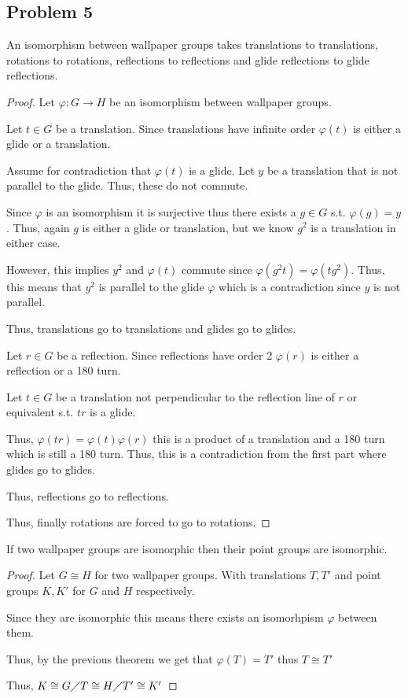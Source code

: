 \documentclass[12pt, letterpaper]{article}
\theoremstyle{definition}
\begin{document}
\subsection*{Problem 5}
\begin{theorem}
    An isomorphism between wallpaper groups takes translations to translations, rotations to rotations, reflections to reflections and glide reflections to glide reflections.
\end{theorem}
    \begin{proof}
        Let $\varphi: G \rightarrow H$ be an isomorphism between wallpaper groups.

        Let $t \in G$ be a translation. Since translations have infinite order $\varphi(t)$ is either a glide or a translation.

        Assume for contradiction that $\varphi(t)$ is a glide. Let $y$ be a translation that is not parallel to the glide. Thus, these do not commute.

        Since $\varphi$ is an isomorphism it is surjective thus there exists a $g \in G$ s.t. $\varphi(g)=y$. Thus, again $g$ is either a glide or translation, but we know $g^2$ is a translation in either case.
        
        However, this implies $y^2$ and $\varphi(t)$ commute since $\varphi(g^2t)=\varphi(tg^2)$. Thus, this means that $y^2$ is parallel to the glide $\varphi$ which is a contradiction since $y$ is not parallel.

        Thus, translations go to translations and glides go to glides.

        Let $r \in G$ be a reflection. Since reflections have order 2 $\varphi(r)$ is either a reflection or a 180 turn.
        
        Let $t \in G$ be a translation not perpendicular to the reflection line of $r$ or equivalent s.t. $tr$ is a glide.

        Thus, $\varphi(tr)=\varphi(t)\varphi(r)$ this is a product of a translation and a 180 turn which is still a 180 turn. Thus, this is a contradiction from the first part where glides go to glides.

        Thus, reflections go to reflections.

        Thus, finally rotations are forced to go to rotations.
    \end{proof}
\begin{corollary}
    If two wallpaper groups are isomorphic then their point groups are isomorphic.
\end{corollary}
    \begin{proof}
        Let $G\cong H$ for two wallpaper groups. With translations $T,T'$ and point groups $K,K'$ for $G$ and $H$ respectively.

        Since they are isomorphic this means there exists an isomorhpism $\varphi$ between them.

        Thus, by the previous theorem we get that $\varphi(T)=T'$ thus $T \cong T'$

        Thus, $K \cong G \diagup T \cong H \diagup T' \cong K'$
    \end{proof}
\end{document}

